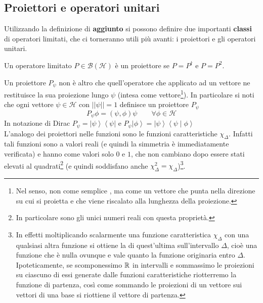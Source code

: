 %

%


\subsection{Proiettori e operatori unitari}
Utilizzando la definizione di \textbf{aggiunto} si possono definire due importanti \textbf{classi} di operatori limitati, che ci torneranno utili più avanti: i proiettori e gli operatori unitari.
\begin{dfn}[Proiettore]
 Un operatore limitato $P\in\mathcal{B}(\mathcal{H})$ è un proiettore se $P=P^\dag$ e $P=P^2$.
\end{dfn}
Un proiettore $P_\psi$ non è altro che quell'operatore che applicato ad un vettore ne restituisce la sua proiezione lungo $\psi$ (intesa come vettore\footnote{Nel senso, non come semplice , ma come un vettore che punta nella direzione su cui si proietta e che viene riscalato alla lunghezza della proiezione.}).
In particolare si noti che ogni vettore $\psi\in\mathcal{H}$ con $\left|\left|\psi\right|\right|=1$ definisce un proiettore $P_\psi$
\begin{equation}
P_\psi\phi=\left(\psi,\phi\right)\psi\qquad \forall\phi\in\mathcal{H}
\label{eqn:proiettore}
\end{equation}
In notazione di Dirac $P_\psi=\left|\psi\right\rangle\left\langle\psi\right|$ e $P_\psi\left|\phi\right\rangle=\left|\psi\right\rangle\left\langle\psi\middle|\phi\right\rangle$\\
L'analogo dei proiettori nelle funzioni sono le funzioni caratteristiche $\chi_\Delta$. Infatti tali funzioni sono a valori reali (e quindi la simmetria è immediatamente verificata) e hanno come valori solo $0$ e $1$, che non cambiano dopo essere stati elevati al quadrati\footnote{In particolare sono gli unici numeri reali con questa proprietà.} (e quindi soddisfano anche $\chi_\Delta^2 = \chi_\Delta$)\footnote{In effetti moltiplicando scalarmente una funzione caratteristica $\chi_\Delta$ con una qualsiasi altra funzione si ottiene la  di quest'ultima sull'intervallo $\Delta$, cioè una funzione che è nulla ovunque e vale quanto la funzione originaria entro $\Delta$. Ipoteticamente, se scomponessimo $\mathbb{R}$ in intervalli e sommassimo le proiezioni su ciascuno di essi generate dalle funzioni caratteristiche riotterremo la funzione di partenza, così come sommando le proiezioni di un vettore sui vettori di una base si riottiene il vettore di partenza.}.

